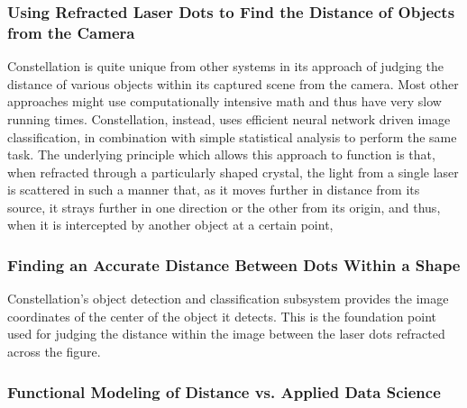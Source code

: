 \subsubsection{Using Refracted Laser Dots to Find the Distance of Objects from the Camera}
Constellation is quite unique from other systems in its approach of judging the distance of various objects within its captured scene from the camera. Most other approaches might use computationally intensive math and thus have very slow running times. Constellation, instead, uses efficient neural network driven image classification, in combination with simple statistical analysis to perform the same task. The underlying principle which allows this approach to function is that, when refracted through a particularly shaped crystal, the light from a single laser is scattered in such a manner that, as it moves further in distance from its source, it strays further in one direction or the other from its origin, and thus, when it is intercepted by another object at a certain point, 
\subsubsection{Finding an Accurate Distance Between Dots Within a Shape}
Constellation's object detection and classification subsystem provides the image coordinates of the center of the object it detects. This is the foundation point used for judging the distance within the image between the laser dots refracted across the figure.
\subsubsection{Functional Modeling of Distance vs. Applied Data Science}